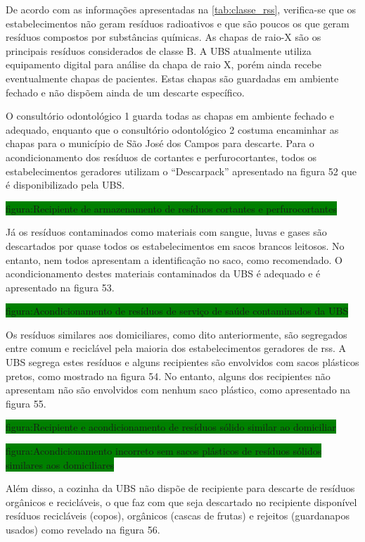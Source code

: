 	
	
	De acordo com as informações apresentadas na \autoref{tab:classe_rss}, verifica-se que os estabelecimentos não geram resíduos radioativos e que são poucos os que geram resíduos compostos por substâncias químicas. As chapas de raio-X são os principais resíduos considerados de classe B. A UBS atualmente utiliza equipamento digital para análise da chapa de raio X, porém ainda recebe eventualmente chapas de pacientes. Estas chapas são guardadas em ambiente fechado e não dispõem ainda de um descarte específico.
	
	O consultório odontológico 1 guarda todas as chapas em ambiente fechado e adequado, enquanto que o consultório odontológico 2 costuma encaminhar as chapas para o município de São José dos Campos para descarte.
	Para o acondicionamento dos resíduos de cortantes e perfurocortantes, todos os estabelecimentos geradores utilizam o “Descarpack” apresentado na figura 52 que é disponibilizado pela UBS.
	
	\colorbox{green}{figura:Recipiente de armazenamento de resíduos cortantes e perfurocortantes}
	
	Já os resíduos contaminados como materiais com sangue, luvas e gases são descartados por quase todos os estabelecimentos em sacos brancos leitosos. No entanto, nem todos apresentam a identificação no saco, como recomendado. O acondicionamento destes materiais contaminados da UBS é adequado e é apresentado na figura 53.
	
	\colorbox{green}{figura:Acondicionamento de resíduos de serviço de saúde contaminados da UBS}
	
	Os resíduos similares aos domiciliares, como dito anteriormente, são segregados entre comum e reciclável pela maioria dos estabelecimentos geradores de \gls{rss}. A UBS segrega estes resíduos e alguns recipientes são envolvidos com sacos plásticos pretos, como mostrado na figura 54. No entanto, alguns dos recipientes não apresentam não são envolvidos com nenhum saco plástico, como apresentado na figura 55.
	
	\colorbox{green}{figura:Recipiente e acondicionamento de resíduos sólido similar ao domiciliar}
	
	\colorbox{green}{figura:Acondicionamento incorreto sem sacos plásticos de resíduos sólidos similares aos domiciliares}
	
	Além disso, a cozinha da UBS não dispõe de recipiente para descarte de resíduos orgânicos e recicláveis, o que faz com que seja descartado no recipiente disponível resíduos recicláveis (copos), orgânicos (cascas de frutas) e rejeitos (guardanapos usados) como revelado na figura 56. 
	
